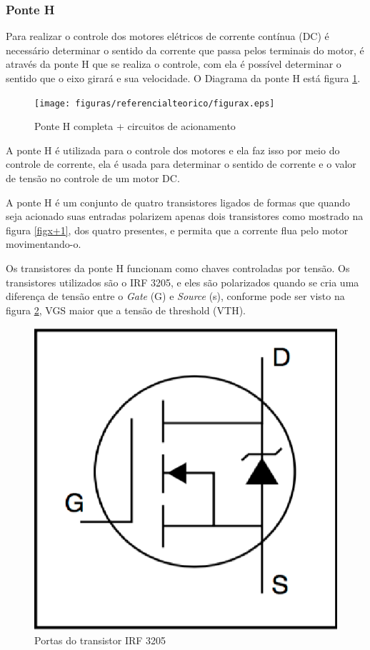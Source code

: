 \subsubsection{Ponte H}

Para realizar o controle dos motores elétricos de corrente contínua (DC) é necessário determinar o sentido da corrente que passa pelos terminais do motor, é através da ponte H que se realiza o controle, com ela é possível determinar o sentido que o eixo girará e sua velocidade. O Diagrama da ponte H está figura \ref{figx}.

\begin{figure}[!htb]
	\centering
	\texttt{[image: figuras/referencialteorico/figurax.eps]}
	\caption{Ponte H completa + circuitos de acionamento}
	\label{figx}
\end{figure}

A ponte H é utilizada para o controle dos motores e ela faz isso por meio do controle de corrente, ela é usada para determinar o sentido de corrente e o valor de tensão no controle de um motor DC.

A ponte H é um conjunto de quatro transistores ligados de formas que quando seja acionado suas entradas polarizem apenas dois transistores como mostrado na figura \ref{figx+1}, dos quatro presentes, e permita que a corrente flua pelo motor movimentando-o.

Os transistores da ponte H funcionam como chaves controladas por tensão. Os transistores utilizados são o IRF 3205, e eles são polarizados quando se cria uma diferença de tensão entre o \textit{Gate} (G) e \textit{Source} (s), conforme pode ser visto na figura \ref{fig:portas_transistor_irf}, VGS maior que a tensão de threshold (VTH).

\begin{figure}[!htb]
	\centering
	\includegraphics[keepaspectratio=true,scale=0.8]{figuras/referencialteorico/portas_irf_3205}
	\caption{Portas do transistor IRF 3205 \cite{datasheet_irf_3205}}
	\label{fig:portas_transistor_irf}
\end{figure}

